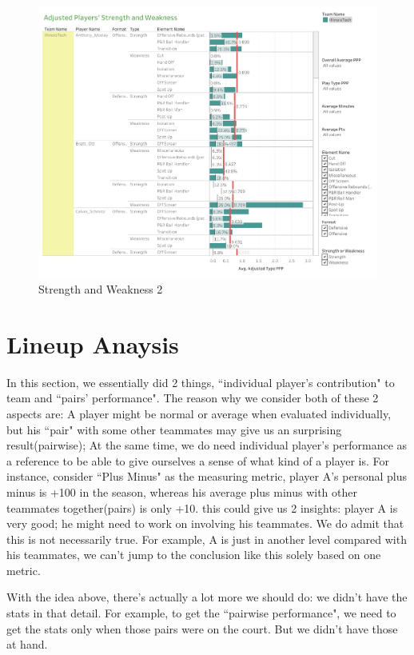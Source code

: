 \documentclass[conference]{IEEEtran}
\begin{document}
\begin{figure}
  \includegraphics[width=\linewidth]{Strength_Weakness_2.jpg}
  \caption{Strength and Weakness 2}
  \vspace{-1mm}
  \label{fig:S-and-W-2}
\end{figure}

\section{Lineup Anaysis}
In this section, we essentially did 2 things, ``individual player's contribution" to team and ``pairs' performance". The reason why we consider both of these 2 aspects are: A player might be normal or average when evaluated individually, but his ``pair" with some other teammates may give us an surprising result(pairwise); At the same time, we do need individual player's performance as a reference to be able to give ourselves a sense of what kind of a player is. For instance, consider ``Plus Minus" as the measuring metric, player A's personal plus minus is +100 in the season, whereas his average plus minus with other teammates together(pairs) is only +10. this could give us 2 insights: player A is very good; he might need to work on involving his teammates. We do admit that this is not necessarily true. For example, A is just in another level compared with his teammates, we can't jump to the conclusion like this solely based on one metric.

With the idea above, there's actually a lot more we should do: we didn't have the stats in that detail. For example, to get the ``pairwise performance", we need to get the stats only when those pairs were on the court. But we didn't have those at hand.
\end{document}
